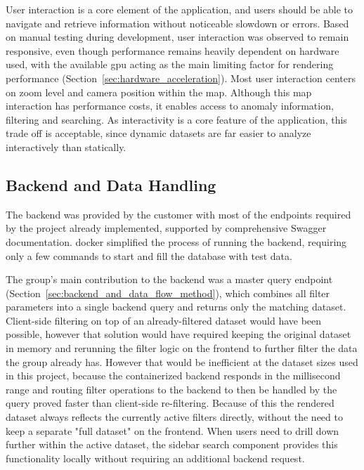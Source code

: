 User interaction is a core element of the application, and users should be able to navigate and retrieve information without noticeable slowdown or errors. Based on manual testing during development, user interaction was observed to remain responsive, even though performance remains heavily dependent on hardware used, with the available \acrshort{gpu} acting as the main limiting factor for rendering performance (Section~\ref{sec:hardware_acceleration}).%
Most user interaction centers on zoom level and camera position within the map. Although this map interaction has performance costs, it enables access to anomaly information, filtering and searching. As interactivity is a core feature of the application, this trade off is acceptable, since dynamic datasets are far easier to analyze interactively than statically.


\subsection{Backend and Data Handling}

The backend was provided by the customer with most of the endpoints required by the project already implemented, supported by comprehensive Swagger documentation. \gls{docker} simplified the process of running the backend, requiring only a few commands to start and fill the database with test data. 

The group's main contribution to the backend was a master query endpoint (Section~\ref{sec:backend_and_data_flow_method}), which combines all filter parameters into a single backend query and returns only the matching dataset.
Client-side filtering on top of an already-filtered dataset would have been possible, however that solution would have required keeping the original dataset in memory and rerunning the filter logic on the frontend to further filter the data the group already has. However that would be inefficient at the dataset sizes used in this project, because the containerized backend responds in the millisecond range and routing filter operations to the backend to then be handled by the query proved faster than client-side re-filtering. Because of this the rendered dataset always reflects the currently active filters directly, without the need to keep a separate "full dataset" on the frontend. When users need to drill down further within the active dataset, the sidebar search component provides this functionality locally without requiring an additional backend request.

